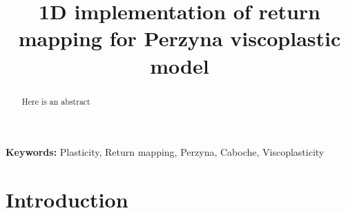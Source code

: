 \documentclass[12pts]{article}
\title{1D implementation of return mapping for Perzyna viscoplastic model}
\begin{document}
\begin{abstract}
Here is an abstract
\end{abstract}
\noindent \textbf{Keywords: } Plasticity, Return mapping, Perzyna, Caboche, Viscoplasticity

\section{Introduction}
\label{sect:intro}



\end{document}
